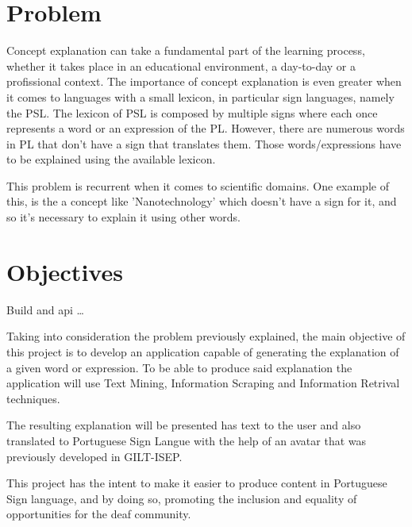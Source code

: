 \section{Problem}

Concept explanation can take a fundamental part of the learning process, whether it takes place in an educational environment, a day-to-day or a profissional context.
The importance of concept explanation is even greater when it comes to languages with a small lexicon, in particular sign languages, namely the \gls{PSL}.
The lexicon of \gls{PSL} is composed by multiple signs where each once represents a word or an expression of the \gls{PL}.
However, there are numerous words in \gls{PL} that don't have a sign that translates them.
Those words/expressions have to be explained using the available lexicon.

This problem is recurrent when it comes to scientific domains.
One example of this, is the a concept like 'Nanotechnology' which doesn't have a sign for it, and so it's necessary to explain it using other words.

\section{Objectives}

Build and api \dots

Taking into consideration the problem previously explained, the main objective of this project is to develop an application capable of generating the explanation of a given word or expression.
To be able to produce said explanation the application will use Text Mining, Information Scraping and Information Retrival techniques.

The resulting explanation will be presented has text to the user and also translated to Portuguese Sign Langue with the help of an avatar that was previously developed in GILT-ISEP.

This project has the intent to make it easier to produce content in Portuguese Sign language, and by doing so, promoting the inclusion and equality of opportunities for the deaf community. 

